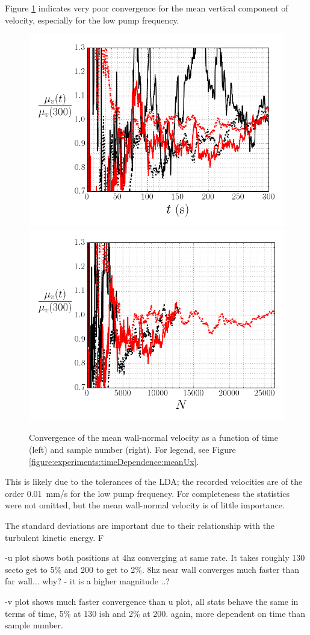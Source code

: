 \documentclass[12pt,oneside,a4paper]{article}
\begin{document}
Figure \ref{figure:experiments:timeDependence:meanUy} indicates very poor convergence for the mean vertical component of velocity, especially for the low pump frequency.
%
\begin{figure}[!h]
\centering
\includegraphics[width=0.5\linewidth]{images/LDA_timeDependenceImages/UyMeanTConvergence.png}\hfill
\includegraphics[width=0.5\linewidth]{images/LDA_timeDependenceImages/UyMeanNConvergence.png}\\
\caption{Convergence of the mean wall-normal velocity as a function of time (left) and sample number (right). For legend, see Figure \ref{figure:experiments:timeDependence:meanUx}.}
\label{figure:experiments:timeDependence:meanUy}
\end{figure}
%
 This is likely due to the tolerances of the LDA; the recorded velocities are of the order  \SI{0.01}{mm/s} for the low pump frequency. For completeness the statistics were not omitted, but the mean wall-normal velocity is of little importance. 

The standard deviations are important due to their relationship with the turbulent kinetic energy. F

-u plot shows both positions at 4hz converging at same rate. It takes roughly 130 secto get to 5\% and 200 to get to 2\%. 8hz near wall converges much faster than far wall... why? - it is a higher magnitude ..?

-v plot shows much faster convergence than u plot, all stats behave the same in terms of time, 5\% at 130 ish and 2\% at 200. again, more dependent on time than sample number.
\end{document}
